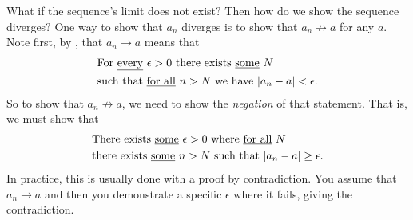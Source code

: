 \documentclass[11pt,twoside=off,numbers=noenddot]{scrbook}
\begin{document}
\begin{outline}
  What if the sequence's limit does not exist? Then how do we show
  the sequence diverges? One way to show that $a_n$ diverges is to
  show that $a_n \not\to a$ for any $a$. Note first, by
  , that $a_n \to a$ means that
  \begin{align*}
    & \text{For \underline{every} $\epsilon > 0$ there exists
    \underline{some} $N$} \\
    & \text{such that \underline{for all} $n > N$ we have $| a_n -
    a | < \epsilon$}.
  \end{align*}
  So to show that $a_n \not\to a$, we need to show the
  \textit{negation} of that statement. That is, we must show that
  \begin{align*}
    & \text{There exists \underline{some} $\epsilon > 0$ where
    \underline{for all} $N$} \\
    & \text{there exists \underline{some} $n > N$ such that $| a_n -
    a | \geq \epsilon$}.
  \end{align*}
  In practice, this is usually done with a proof by contradiction.
  You assume that $a_n \to a$ and then you demonstrate a specific
  $\epsilon$ where it fails, giving the contradiction.
\end{outline}
\end{document}
